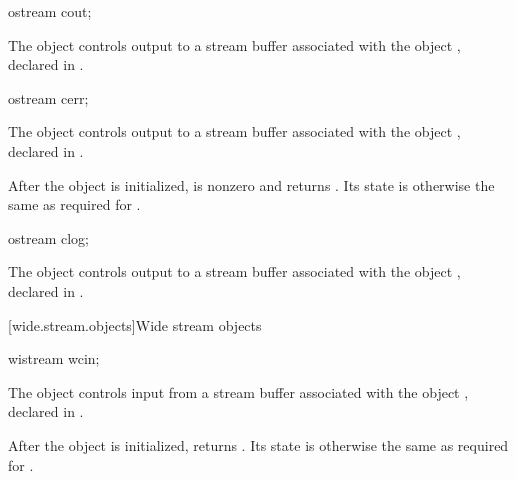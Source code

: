 %
\begin{itemdecl}
ostream cout;
\end{itemdecl}

\begin{itemdescr}
\pnum
The object
controls output to a stream buffer
associated with the object
,
declared in
%
.
\end{itemdescr}

%
\begin{itemdecl}
ostream cerr;
\end{itemdecl}

\begin{itemdescr}
\pnum
The object
controls output to a stream buffer
associated with the object
,
declared in
%
.

\pnum
After the object
is initialized,
is nonzero and  returns .
Its state is otherwise the same as required for
.
\end{itemdescr}

%
\begin{itemdecl}
ostream clog;
\end{itemdecl}

\begin{itemdescr}
\pnum
The object
controls output to a stream buffer
associated with the object
,
declared in
%
.
\end{itemdescr}

[wide.stream.objects]{Wide stream objects}

%
\begin{itemdecl}
wistream wcin;
\end{itemdecl}

\begin{itemdescr}
\pnum
The object
controls input from a stream buffer
associated with the object
,
declared in
%
.

\pnum
After the object
is initialized,
returns
.
Its state is otherwise the same as required for
.
\end{itemdescr}


